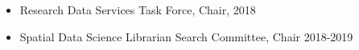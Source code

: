 \begin{itemize}

\item Research Data Services Task Force, Chair, 2018 
\item Spatial Data Science Librarian Search Committee, Chair 2018-2019
\end{itemize}